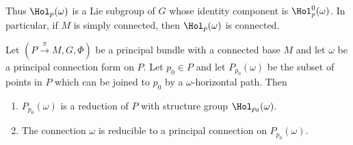 \begin{rem}
    Thus $\Hol_p(\omega)$ is a Lie subgroup of $G$ whose identity component is $\Hol_p^0(\omega)$. In particular, if $M$ is simply connected, then $\Hol_p(\omega)$ is connected.
\end{rem}

\begin{prop}[{{\cite[Prop.~1.7.12]{RS2}}}]\label{prop 1.7.12 RS2}
    Let $(P\overset{\pi}{\to}M,G,\Phi)$ be a principal bundle with a connected base $M$ and let $\omega$ be a principal connection form on $P$. Let $p_0\in P$ and let $P_{p_0}(\omega)$ be the subset of points in $P$ which can be joined to $p_0$ by a $\omega$-horizontal path. Then
    \begin{enumerate}
        \item $P_{p_0}(\omega)$ is a reduction of $P$ with structure group $\Hol_{p_0}(\omega)$.
        \item The connection $\omega$ is reducible to a principal connection on $P_{p_0}(\omega)$.
    \end{enumerate}
\end{prop}
